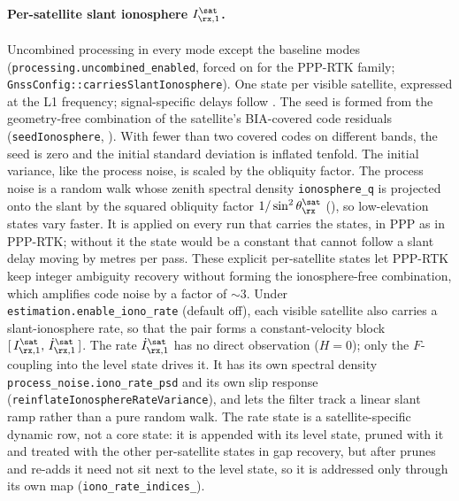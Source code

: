 \paragraph{Per-satellite slant ionosphere $I^\sat_{\rx,1}$.}
Uncombined processing in every mode except the baseline modes
(\texttt{processing.uncombined\_enabled}, forced on for the PPP-RTK family;
\texttt{GnssConfig::carriesSlantIonosphere}).  One state per visible
satellite, expressed at the L1 frequency; signal-specific delays follow
.  The seed is formed from the geometry-free
combination of the satellite's BIA-covered code residuals
(\texttt{seedIonosphere}, ).  With fewer than two
covered codes on different bands, the seed is zero and the initial standard
deviation is inflated tenfold.  The initial variance, like the process noise,
is scaled by the obliquity factor.  The process noise is a random walk
whose zenith spectral density \texttt{ionosphere\_q} is projected onto the
slant by the squared obliquity factor $1/\sin^2\theta^\sat_\rx$
(), so low-elevation states vary faster.  It is applied
on every run that carries the states, in PPP as in PPP-RTK; without it the
state would be a constant that cannot follow a slant delay moving by metres
per pass.  These
explicit per-satellite states let PPP-RTK keep integer ambiguity recovery
without forming the ionosphere-free combination, which amplifies code
noise by a factor of $\sim 3$.  Under \texttt{estimation.enable\_iono\_rate}
(default off), each visible satellite also carries a slant-ionosphere
rate, so that the pair forms a constant-velocity block
$[\,I^\sat_{\rx,1},\,\dot I^\sat_{\rx,1}\,]$.  The rate
$\dot I^\sat_{\rx,1}$ has no direct observation ($H=0$); only the
$F$-coupling into the level state drives it.  It has its own spectral
density \texttt{process\_noise.iono\_rate\_psd} and its own slip response
(\texttt{reinflateIonosphereRateVariance}), and lets the filter track a
linear slant ramp rather than a pure random walk.  The rate state is a
satellite-specific dynamic row, not a core state: it is appended with its
level state, pruned with it and treated with the other per-satellite
states in gap recovery, but after prunes and re-adds it need not sit next
to the level state, so it is addressed only through its own map
(\texttt{iono\_rate\_indices\_}).

